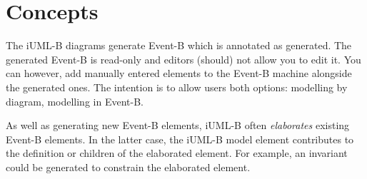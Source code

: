 \section{Concepts}
\label{sec:iumlb-concepts}

The iUML-B diagrams generate Event-B which is annotated as generated.
The generated Event-B is read-only and editors (should) not allow you to edit it.
You can however, add manually entered elements to the Event-B machine alongside the generated ones.
The intention is to allow users both options: modelling by diagram, modelling in Event-B.

As well as generating new Event-B elements, iUML-B often \emph{elaborates} existing Event-B elements.
In the latter case, the iUML-B model element contributes to the definition or children of the elaborated element.
For example, an invariant could be generated to constrain the elaborated element.


